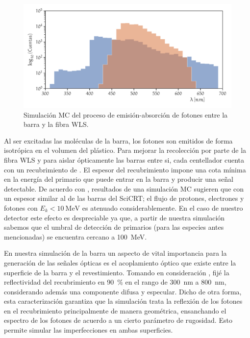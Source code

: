 \begin{figure}
        \centering
        \includegraphics[width=\textwidth]{sim-optics-spect.pdf}
        \caption{Simulación MC del proceso de emisión-absorción de fotones entre la barra y la fibra WLS.}
        \label{fig:sim-optics}
\end{figure}

Al ser excitadas las moléculas de la barra, los fotones son emitidos de forma isotrópica en el volumen del plástico. Para mejorar la recolección por parte de la fibra WLS y para aislar ópticamente las barras entre si, cada centellador cuenta con un recubrimiento de . El espesor del recubrimiento impone una cota mínima en la energía del primario que puede entrar en la barra y producir una señal detectable. De acuerdo con \cite{gros18}, resultados de una simulación MC sugieren que con un espesor similar al de las barras del SciCRT; el flujo de protones, electrones y fotones con $E_{k}<\SI{10}{\mega\electronvolt}$ es atenuado considerablemente. En el caso de nuestro detector este efecto es despreciable ya que, a partir de nuestra  simulación sabemos que el umbral de detección de primarios (para las especies antes mencionadas) se encuentra cercano a \SI{100}{\mega\electronvolt}.

En nuestra simulación de la barra un aspecto de vital importancia para la generación de las señales ópticas es el acoplamiento óptico que existe entre la superficie de la barra y el revestimiento. Tomando en consideración \cite{dietz16,gros18}, fijé la reflectividad del recubrimiento en \SI{90}{\percent} en el rango de \SI{300}{\nano\metre} a \SI{800}{\nano\metre}, considerando además una componente difusa y especular. Dicho de otra forma, esta caracterización garantiza que la simulación trata la reflexión de los fotones en el recubrimiento principalmente de manera geométrica, ensanchando el espectro de los fotones de acuerdo a un cierto parámetro de rugosidad. Esto permite simular las imperfecciones en ambas superficies.

